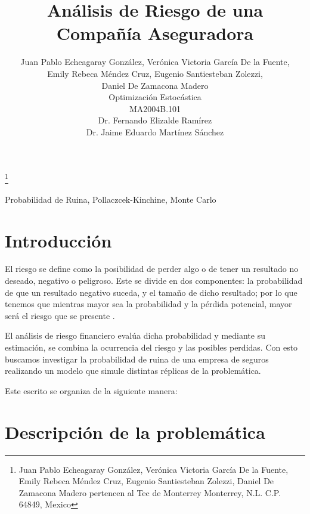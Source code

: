 \documentclass[journal]{IEEEtran}
\title{\LARGE \bf Análisis de Riesgo de una Compañía Aseguradora}
\author{Juan Pablo Echeagaray González, Verónica Victoria García De la Fuente, \\ Emily Rebeca Méndez Cruz, Eugenio Santiesteban Zolezzi, \\ Daniel De Zamacona Madero \\
Optimización Estocástica \\
MA2004B.101 \\
Dr. Fernando Elizalde Ramírez \\
Dr. Jaime Eduardo Martínez Sánchez}
\begin{document}
    \thanks{Juan Pablo Echeagaray González, Verónica Victoria García De la Fuente, Emily Rebeca Méndez Cruz, Eugenio Santiesteban Zolezzi, Daniel De Zamacona Madero pertencen al Tec de Monterrey Monterrey, N.L. C.P. 64849, Mexico {\tt\small}}
    
    \maketitle
    
    \thispagestyle{empty}
    \pagestyle{empty}
    \begin{abstract}
       
    \end{abstract}
    
    \begin{IEEEkeywords} 
        Probabilidad de Ruina, Pollaczcek-Kinchine, Monte Carlo
    \end{IEEEkeywords}
    \section{Introducción}
    
        El riesgo se define como la posibilidad de perder algo o de tener un resultado no deseado, negativo o peligroso. Este se divide en dos componentes: la probabilidad de que un resultado negativo suceda, y el tamaño de dicho resultado; por lo que tenemos que mientras mayor sea la probabilidad y la pérdida potencial, mayor será el riesgo que se presente \cite{risk-definition}.
        
        El análisis de riesgo financiero evalúa dicha probabilidad y mediante su estimación, se combina la ocurrencia del riesgo y las posibles perdidas. Con esto buscamos investigar la probabilidad de ruina de una empresa de seguros realizando un modelo que simule distintas réplicas de la problemática.

        Este escrito se organiza de la siguiente manera:
        
        
    \section{Descripción de la problemática}
    
\end{document}
